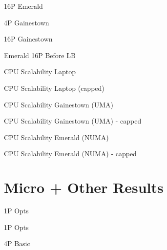 \documentclass{article}
\theoremstyle{remark}
\theoremstyle{remark}
\begin{document}
\pagebreak

\begin{samepage}
16P Emerald




\end{samepage}

\pagebreak

\begin{samepage}
4P Gainestown




\end{samepage}
\pagebreak

\begin{samepage}
16P Gainestown




\end{samepage}
\pagebreak

\begin{samepage}
Emerald 16P Before LB


\end{samepage}
%

CPU Scalability Laptop


CPU Scalability Laptop (capped)


CPU Scalability Gainestown (UMA)


CPU Scalability Gainestown (UMA) - capped


CPU Scalability Emerald (NUMA)


CPU Scalability Emerald (NUMA) - capped


\pagebreak

\section{Micro + Other Results}

\begin{table*}
1P Opts



1P Opts



4P Basic


\end{table*}
\end{document}
